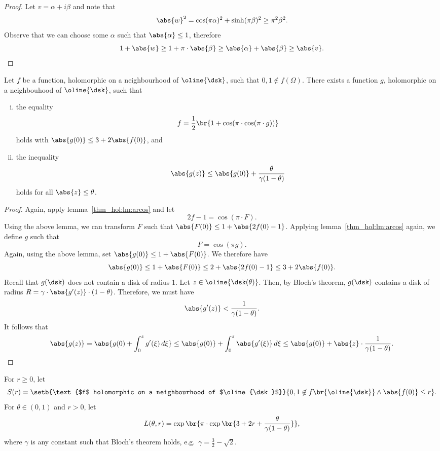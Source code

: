 \begin{proof}
Let $v = \alpha + i \beta$ and note that
\[
\abs{w}^2 =
\cos(\pi \alpha)^2 + \sinh(\pi \beta)^2 \geq
\pi^2 \beta^2.
\]
Observe that we can choose some $\alpha$ such that
$\abs{\alpha} \leq 1$, therefore
\[
1 + \abs{w} \geq
1 + \pi \cdot \abs{\beta} \geq
\abs{\alpha} + \abs{\beta} \geq
\abs{v}. \qedhere
\]
\end{proof}

\begin{izrek}
Let $f$ be a function, holomorphic on a neighbourhood of
$\oline{\dsk}$, such that $0, 1 \not \in f(\Omega)$. There exists a
function $g$, holomorphic on a neighbouhood of $\oline{\dsk}$, such
that

\begin{enumerate}[i)]
\item the equality
\[
f = \frac{1}{2} \br{1 + \cos(\pi \cdot \cos(\pi \cdot g))}
\]
holds with $\abs{g(0)} \leq 3 + 2 \abs{f(0)}$, and
\item the inequality
\[
\abs{g(z)} \leq \abs{g(0)} + \frac{\theta}{\gamma (1 - \theta)}
\]
holds for all $\abs{z} \leq \theta$.
\end{enumerate}
\end{izrek}

\begin{proof}
Again, apply lemma~\ref{thm_hol:lm:arcos} and let
\[
2f - 1 = \cos(\pi \cdot F).
\]
Using the above lemma, we can transform $F$ such that
$\abs{F(0)} \leq 1 + \abs{2f(0) - 1}$. Applying
lemma~\ref{thm_hol:lm:arcos} again, we define $g$ such that
\[
F = \cos(\pi g).
\]
Again, using the above lemma, set $\abs{g(0)} \leq 1 + \abs{F(0)}$.
We therefore have
\[
\abs{g(0)} \leq
1 + \abs{F(0)} \leq
2 + \abs{2f(0) - 1} \leq
3 + 2 \abs{f(0)}.
\]
Recall that $g(\dsk)$ does not contain a disk of radius $1$. Let
$z \in \oline{\dsk(\theta)}$. Then, by Bloch's theorem, $g(\dsk)$
contains a disk of radius
$R = \gamma \cdot \abs{g'(z)} \cdot (1 - \theta)$. Therefore, we
must have
\[
\abs{g'(z)} < \frac{1}{\gamma (1 - \theta)}.
\]
It follows that
\[
\abs{g(z)} =
\abs{g(0) + \int_0^z g'(\xi)\,d\xi} \leq
\abs{g(0)} + \int_0^z \abs{g'(\xi)}\,d\xi \leq
\abs{g(0)} + \abs{z} \cdot \frac{1}{\gamma (1 - \theta)}. \qedhere
\]
\end{proof}

\begin{definicija}
For $r \geq 0$, let
\[
S(r) =
\setb{\text{$f$ holomorphic on a neighbourhood of $\oline{\dsk}$}}
{0, 1 \not \in f \br{\oline{\dsk}} \land \abs{f(0)} \leq r}.
\]
For $\theta \in (0, 1)$ and $r > 0$, let
\[
L(\theta, r) =
\exp \br{\pi \cdot
\exp \br{3 + 2r + \frac{\theta}{\gamma (1 - \theta)}}},
\]
where $\gamma$ is any constant such that Bloch's theorem holds,
e.g.~$\gamma = \frac{3}{2} - \sqrt{2}$.
\end{definicija}

